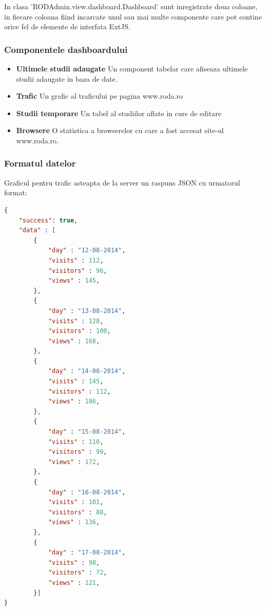 In clasa 'RODAdmin.view.dashboard.Dashboard' sunt inregistrate doua coloane, in fiecare coloana fiind incarcate unul sau mai multe componente care pot contine orice fel de elemente de interfata ExtJS. 

\subsubsection{Componentele dashboardului}

\begin{itemize}

\item \textbf{Ultimele studii adaugate} Un component tabelar care afiseaza ultimele studii adaugate in baza de date. 
\item \textbf{Trafic} Un grafic al traficului pe pagina www.roda.ro
\item \textbf{Studii temporare} Un tabel al studiilor aflate in curs de editare
\item \textbf{Browsere} O statistica a browserelor cu care a fost accesat site-ul www.roda.ro. 

\end{itemize}

\subsubsection{Formatul datelor}

Graficul pentru trafic asteapta de la server un raspuns JSON cu urmatorul format:

\begin{lstlisting}[language=json,firstnumber=1]
{ 
    "success": true,
    "data" : [
        {
            "day" : "12-08-2014",
            "visits" : 112,
            "visitors" : 96,
            "views" : 145,
        },
        {
            "day" : "13-08-2014",
            "visits" : 128,
            "visitors" : 100,
            "views" : 168,
        },
        {
            "day" : "14-08-2014",
            "visits" : 145,
            "visitors" : 112,
            "views" : 186,
        },
        {
            "day" : "15-08-2014",
            "visits" : 110,
            "visitors" : 99,
            "views" : 172,
        },
        {
            "day" : "16-08-2014",
            "visits" : 101,
            "visitors" : 88,
            "views" : 136,
        },
        {
            "day" : "17-08-2014",
            "visits" : 98,
            "visitors" : 72,
            "views" : 121,
        }]
}
\end{lstlisting}


